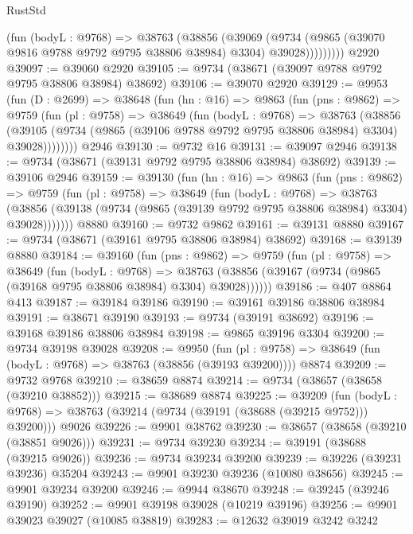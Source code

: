 \begin{lexlean}{RustStd}
\begin{coremodule}
              (fun (bodyL : @9768) =>
              @38763
                (@38856
                  (@39069
                    (@9734
                      (@9865 (@39070 @9816 @9788 @9792 @9795 @38806 @38984) @3304)
                      @39028)))))))))
    @2920
@39097 := @39060 @2920
@39105 := @9734 (@38671 (@39097 @9788 @9792 @9795 @38806 @38984) @38692)
@39106 := @39070 @2920
@39129 := @9953
    (fun (D : @2699) =>
    @38648
      (fun (hn : @16) =>
      @9863
        (fun (pns : @9862) =>
        @9759
          (fun (pl : @9758) =>
          @38649
            (fun (bodyL : @9768) =>
            @38763
              (@38856
                (@39105 (@9734 (@9865 (@39106 @9788 @9792 @9795 @38806 @38984) @3304) @39028))))))))
    @2946
@39130 := @9732 @16
@39131 := @39097 @2946
@39138 := @9734 (@38671 (@39131 @9792 @9795 @38806 @38984) @38692)
@39139 := @39106 @2946
@39159 := @39130
    (fun (hn : @16) =>
    @9863
      (fun (pns : @9862) =>
      @9759
        (fun (pl : @9758) =>
        @38649
          (fun (bodyL : @9768) =>
          @38763
            (@38856 (@39138 (@9734 (@9865 (@39139 @9792 @9795 @38806 @38984) @3304) @39028)))))))
    @8880
@39160 := @9732 @9862
@39161 := @39131 @8880
@39167 := @9734 (@38671 (@39161 @9795 @38806 @38984) @38692)
@39168 := @39139 @8880
@39184 := @39160
    (fun (pns : @9862) =>
    @9759
      (fun (pl : @9758) =>
      @38649
        (fun (bodyL : @9768) =>
        @38763 (@38856 (@39167 (@9734 (@9865 (@39168 @9795 @38806 @38984) @3304) @39028))))))
@39186 := @407 @8864 @413
@39187 := @39184 @39186
@39190 := @39161 @39186 @38806 @38984
@39191 := @38671 @39190
@39193 := @9734 (@39191 @38692)
@39196 := @39168 @39186 @38806 @38984
@39198 := @9865 @39196 @3304
@39200 := @9734 @39198 @39028
@39208 := @9950
    (fun (pl : @9758) => @38649 (fun (bodyL : @9768) => @38763 (@38856 (@39193 @39200))))
    @8874
@39209 := @9732 @9768
@39210 := @38659 @8874
@39214 := @9734 (@38657 (@38658 (@39210 @38852)))
@39215 := @38689 @8874
@39225 := @39209
    (fun (bodyL : @9768) => @38763 (@39214 (@9734 (@39191 (@38688 (@39215 @9752))) @39200)))
    @9026
@39226 := @9901 @38762
@39230 := @38657 (@38658 (@39210 (@38851 @9026)))
@39231 := @9734 @39230
@39234 := @39191 (@38688 (@39215 @9026))
@39236 := @9734 @39234 @39200
@39239 := @39226 (@39231 @39236) @35204
@39243 := @9901 @39230 @39236 (@10080 @38656)
@39245 := @9901 @39234 @39200
@39246 := @9944 @38670
@39248 := @39245 (@39246 @39190)
@39252 := @9901 @39198 @39028 (@10219 @39196)
@39256 := @9901 @39023 @39027 (@10085 @38819)
@39283 := @12632
    @39019
    @3242
    @3242

\end{coremodule}
\end{lexlean}
